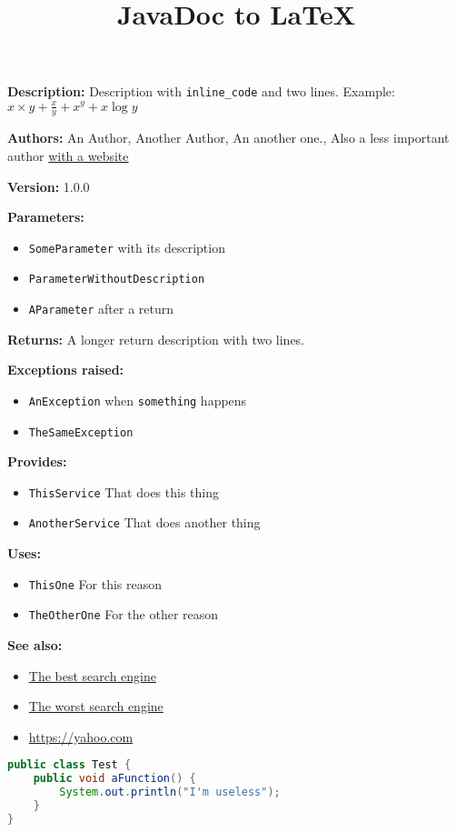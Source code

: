 \documentclass{article}
\title{JavaDoc to LaTeX}
\begin{document}
\textbf{Description:}
 Description with \texttt{inline\_code} and two lines. Example: $x\times y + \frac{x}{y} + x^y + x\log y$  

\textbf{Authors:} An Author,  Another Author,  An another one., Also a less important author \href{https://website.net}{with a website} 

\textbf{Version:} 1.0.0 


\textbf{Parameters:}
\begin{itemize}
  \item\texttt{SomeParameter} with its description 
  \item\texttt{ParameterWithoutDescription}
  \item\texttt{AParameter} after a return 
\end{itemize}

\textbf{Returns:}
A longer return description with two lines. 

\textbf{Exceptions raised:}
\begin{itemize}
  \item\texttt{AnException} when \texttt{something} happens 
  \item\texttt{TheSameException}
\end{itemize}

\textbf{Provides:}
\begin{itemize}
  \item\texttt{ThisService} That does this thing
  \item\texttt{AnotherService} That does another thing
\end{itemize}

\textbf{Uses:}
\begin{itemize}
  \item\texttt{ThisOne} For this reason
  \item\texttt{TheOtherOne} For the other reason
\end{itemize}

\textbf{See also:}
\begin{itemize}
  \item\href{https://google.com}{The best search engine}
  \item\href{https://bing.com}{The worst search engine}
  \item\href{https://yahoo.com}{https://yahoo.com}
\end{itemize}

\begin{lstlisting}[language=Java]
public class Test {
	public void aFunction() {
		System.out.println("I'm useless");
	}
}
\end{lstlisting}
\end{document}
